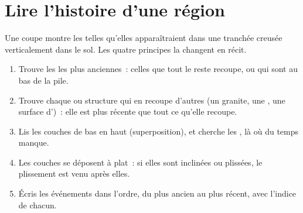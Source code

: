 \section{Lire l'histoire d'une région}

Une coupe montre les  telles qu'elles apparaîtraient dans une
tranchée creusée verticalement dans le sol. Les quatre principes la
changent en récit.

\begin{method}\label{met:g7:geological-time:ordering}
\begin{enumerate}
  \item Trouve les  les plus anciennes~: celles que tout le reste
        recoupe, ou qui sont au bas de la pile.
  \item Trouve chaque  ou structure qui en recoupe d'autres (un
        granite, une , une surface d')~: elle est plus
        récente que tout ce qu'elle recoupe.
  \item Lis les couches de bas en haut (superposition), et cherche les
        , là où du temps manque.
  \item Les couches se déposent à plat~: si elles sont inclinées ou
        plissées, le plissement est venu après elles.
  \item Écris les événements dans l'ordre, du plus ancien au plus récent,
        avec l'indice de chacun.
\end{enumerate}
\end{method}

